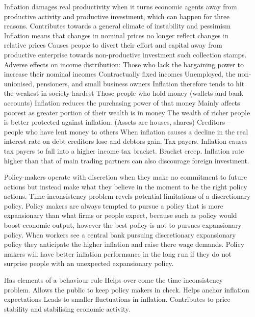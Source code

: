 \documentclass[12pt]{examnotes}
\begin{document}
\ra Inflation damages real productivity when it turns economic agents away from productive activity and productive investment, which can happen for three reasons.
 Contributes towards a general climate of instability and pessimism
 Inflation means that changes in nominal prices no longer reflect changes in relative prices
 Causes people to divert their effort and capital away from productive enterprise towards non-productive investment such collection stamps.
\ra Adverse effects on income distribution:
 Those who lack the bargaining power to increase their nominal incomes
\rna Contractually fixed incomes
\rna Unemployed, the non-unionised, pensioners, and small business owners
\rna Inflation therefore tends to hit the weakest in society hardest
 Those people who hold money (wallets and bank accounts)
\rna Inflation reduces the purchasing power of that money
\rna Mainly affects poorest as greater portion of their wealth is in money
\rna The wealth of richer people is better protected against inflation. (Assets are houses, shares)
 Creditors – people who have lent money to others
\rna When inflation causes a decline in the real interest rate on debt creditors lose and debtors gain.
 Tax payers.
\rna Inflation causes tax payers to fall into a higher income tax bracket.
\rna Bracket creep.
\ra Inflation rate higher than that of main trading partners can also discourage foreign investment.


\ra Policy-makers operate with discretion when they make no commitment to future actions but instead make what they believe in the moment to be the right policy actions.
\ra Time-inconsistency problem revels potential limitations of a discretionary policy.
\ra Policy makers are always tempted to pursue a policy that is more expansionary than what firms or people expect, because such as policy would boost economic output, however the best policy is not to pursues expansionary policy.
\ra When workers see a central bank pursuing discretionary expansionary policy they anticipate the higher inflation and raise there wage demands.
\ra Policy makers will have better inflation performance in the long run if they do not surprise people with an unexpected expansionary policy.


 Has elements of a behaviour rule
\rna Helps over come the time inconsistency problem. 
\rna Allows the public to keep policy makers in check.
 Helps anchor inflation expectations
\rna Leads to smaller fluctuations in inflation. 
\ra Contributes to price stability and stabilising economic activity.
\end{document}
